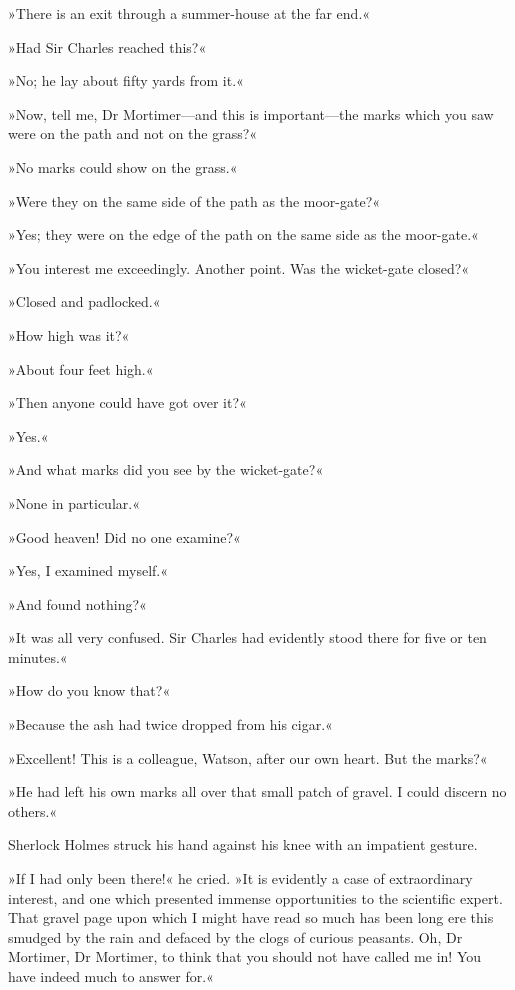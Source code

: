»There is an exit through a summer-house at the far end.«

»Had Sir Charles reached this?«

»No; he lay about fifty yards from it.«

»Now, tell me, Dr Mortimer—and this is important—the marks which you saw were on the path and not on the grass?«

»No marks could show on the grass.«

»Were they on the same side of the path as the moor-gate?«

»Yes; they were on the edge of the path on the same side as the moor-gate.«

»You interest me exceedingly. Another point. Was the wicket-gate closed?«

»Closed and padlocked.«

»How high was it?«

»About four feet high.«

»Then anyone could have got over it?«

»Yes.«

»And what marks did you see by the wicket-gate?«

»None in particular.«

»Good heaven! Did no one examine?«

»Yes, I examined myself.«

»And found nothing?«

»It was all very confused. Sir Charles had evidently stood there for five or ten minutes.«

»How do you know that?«

»Because the ash had twice dropped from his cigar.«

»Excellent! This is a colleague, Watson, after our own heart. But the marks?«

»He had left his own marks all over that small patch of gravel. I could discern no others.«

Sherlock Holmes struck his hand against his knee with an impatient gesture.

»If I had only been there!« he cried. »It is evidently a case of extraordinary interest, and one which presented immense opportunities to the scientific expert. That gravel page upon which I might have read so much has been long ere this smudged by the rain and defaced by the clogs of curious peasants. Oh, Dr Mortimer, Dr Mortimer, to think that you should not have called me in! You have indeed much to answer for.«

